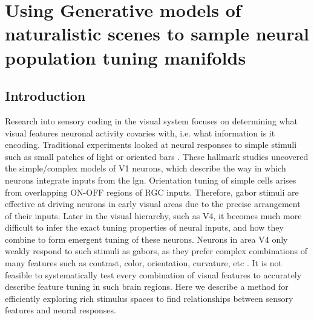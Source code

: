 
\chapter{\color{thesisBlue} Using Generative models of naturalistic scenes to sample neural population tuning manifolds} %

\label{ch:maps} %




\section{Introduction}
Research into sensory coding in the visual system focuses on determining what visual features neuronal activity covaries with, i.e. what information is it encoding. Traditional experiments looked at neural responses to simple stimuli such as small patches of light or oriented bars \parencite{Hubel1959}. These hallmark studies uncovered the simple/complex models of V1 neurons, which describe the way in which neurons integrate inputs from the \gls{lgn}. Orientation tuning of simple cells arises from overlapping ON-OFF regions of RGC inputs. Therefore, gabor stimuli are effective at driving neurons in early visual areas due to the precise arrangement of their inputs. Later in the visual hierarchy, such as V4, it becomes much more difficult to infer the exact tuning properties of neural inputs, and how they combine to form emergent tuning of these neurons. Neurons in area V4 only weakly respond to such stimuli as gabors, as they prefer complex combinations of many features such as contrast, color, orientation, curvature, etc \parencite{Sani2013,Tanigawa2010, Nandy2016}. It is not feasible to systematically test every combination of visual features to accurately describe feature tuning in such brain regions. Here we describe a method for efficiently exploring rich stimulus spaces to find relationships between sensory features and neural responses.

